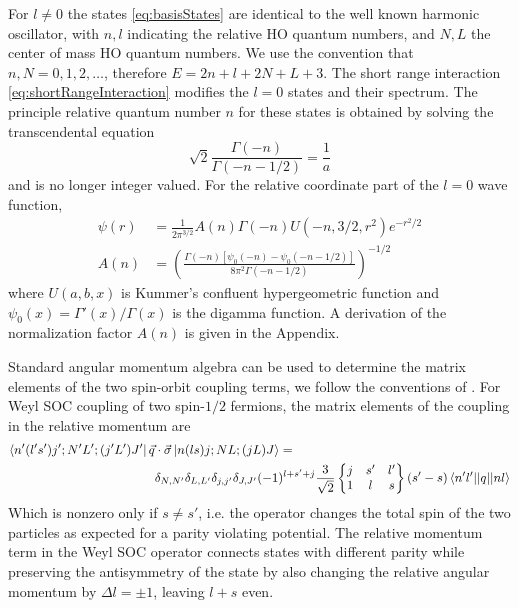 \documentclass[%
 preprint,
 amsmath,amssymb,
 aps,
]{revtex4-1}
\newcommand{\sixj}[6]{ \begin{Bmatrix}
  #1 & #2 & #3 \\
  #4 & #5 & #6 
 \end{Bmatrix}}
\begin{document}
For $l\neq0$ the states \eqref{eq:basisStates} are identical to the well known harmonic oscillator, with $n,l$ indicating the relative HO quantum numbers, and $N,L$ the center of mass HO quantum numbers. We use the convention that $n,N=0,1,2,\dots$, therefore $E=2n+l+2N+L+3$. The short range interaction \eqref{eq:shortRangeInteraction} modifies the $l=0$ states and their spectrum. The principle relative quantum number $n$ for these states is obtained by solving the transcendental equation
\begin{equation}\label{eq:eigenvalueEqn}
\sqrt{2}\frac{\Gamma(-n)}{\Gamma(-n-1/2)}=\frac{1}{a}
\end{equation}
and is no longer integer valued. For the relative coordinate part of the $l=0$ wave function,
\begin{align}
\psi(r)&=\frac{1}{2\pi^{3/2}}A(n)\Gamma(-n)U(-n,3/2,r^2)e^{-r^2/2} \label{eq:BuschWF}\\
A(n)&=\left(\frac{\Gamma(-n)[\psi_0(-n)-\psi_0(-n-1/2)]}{8 \pi^2 \Gamma(-n-1/2)}\right)^{-1/2}
\end{align}
where $U(a,b,x)$ is Kummer's confluent hypergeometric function and $\psi_0(x)=\Gamma'(x)/\Gamma(x)$ is the digamma function. A derivation of the normalization factor $A(n)$ is given in the Appendix.

Standard angular momentum algebra can be used to determine the matrix elements of the two spin-orbit coupling terms, we follow the conventions of \cite{Edmonds}. For Weyl SOC coupling of two spin-$1/2$ fermions, the matrix elements of the coupling in the relative momentum are
\begin{equation}\label{eq:WeylRel}\begin{split}
\bra{n'(l's')j';N'L';(j'L')J'}\vec{q}&\cdot\vec{\sigma} \ket{n(ls)j;NL;(jL)J} = \\
&\delta_{N,N'}\delta_{L,L'}\delta_{j,j'}\delta_{J,J'}(-1)^{l+s'+j}\frac{3}{\sqrt{2}}\sixj{j}{s'}{l'}{1}{l}{s} (s'-s)\braket{n'l' || q || n l}
\end{split}
\end{equation}
Which is nonzero only if $s\neq s'$, i.e. the operator changes the total spin of the two particles as expected for a parity violating potential. The relative momentum term in the Weyl SOC operator connects states with different parity while preserving the antisymmetry of the state by also changing the relative angular momentum by $\Delta l = \pm1$, leaving $l+s$ even. 
\end{document}
